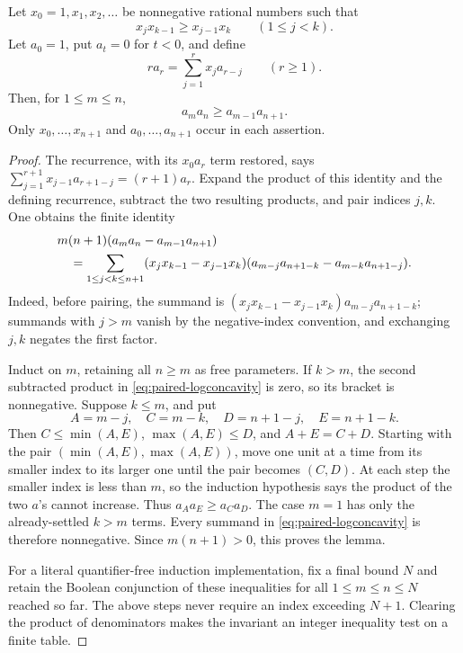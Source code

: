\begin{lemma}\label{lem:coefficient-logconcave}
Let $x_0=1,x_1,x_2,\ldots$ be nonnegative rational numbers such that
\[
 x_jx_{k-1}\geq x_{j-1}x_k\qquad(1\leq j<k).
\]
Let $a_0=1$, put $a_t=0$ for $t<0$, and define
\[
 r a_r=\sum_{j=1}^{r}x_j a_{r-j}\qquad(r\geq1).
\]
Then, for $1\leq m\leq n$,
\begin{equation}\label{eq:general-logconcavity}
 a_m a_n\geq a_{m-1}a_{n+1}.
\end{equation}
Only $x_0,\ldots,x_{n+1}$ and $a_0,\ldots,a_{n+1}$ occur in each assertion.
\end{lemma}
\begin{proof}
The recurrence, with its $x_0a_r$ term restored, says
$\sum_{j=1}^{r+1}x_{j-1}a_{r+1-j}=(r+1)a_r$.
Expand the product of this identity and the defining recurrence, subtract
the two resulting products, and pair indices $j,k$. One obtains the finite
identity
\begin{align}\label{eq:paired-logconcavity}
 &m(n+1)(a_m a_n-a_{m-1}a_{n+1})\notag\\
 &\quad=\sum_{1\leq j<k\leq n+1}
 (x_jx_{k-1}-x_{j-1}x_k)
 (a_{m-j}a_{n+1-k}-a_{m-k}a_{n+1-j}).
\end{align}
Indeed, before pairing, the summand is
$(x_jx_{k-1}-x_{j-1}x_k)a_{m-j}a_{n+1-k}$; summands with $j>m$ vanish by the
negative-index convention, and exchanging $j,k$ negates the first factor.

Induct on $m$, retaining all $n\geq m$ as free parameters. If $k>m$, the
second subtracted product in \eqref{eq:paired-logconcavity} is zero, so its
bracket is nonnegative. Suppose $k\leq m$, and put
\[
 A=m-j,\quad C=m-k,\quad D=n+1-j,\quad E=n+1-k.
\]
Then $C\leq\min(A,E)$, $\max(A,E)\leq D$, and $A+E=C+D$.
Starting with the pair $(\min(A,E),\max(A,E))$, move one unit at a time
from its smaller index to its larger one until the pair becomes $(C,D)$.
At each step the smaller index is less than $m$, so the induction hypothesis
says the product of the two $a$'s cannot increase. Thus
$a_Aa_E\geq a_Ca_D$. The case $m=1$ has only the already-settled
$k>m$ terms. Every summand in \eqref{eq:paired-logconcavity} is therefore
nonnegative. Since $m(n+1)>0$, this proves the lemma.

For a literal quantifier-free induction implementation, fix a final bound
$N$ and retain the Boolean conjunction of these inequalities for all
$1\leq m\leq n\leq N$ reached so far. The above steps never require an index
exceeding $N+1$. Clearing the product of denominators makes the invariant an
integer inequality test on a finite table.
\end{proof}

